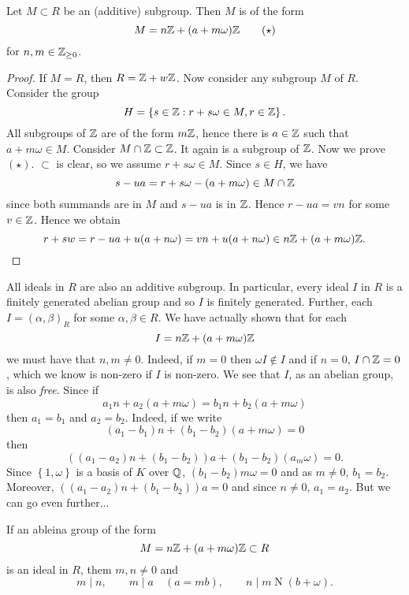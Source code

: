 
\begin{proposition}[]
	Let $M \subset R$ be an (additive) subgroup.
	Then $M$ is of the form
	\[
		M = n\mathbb{Z} + (a + m\omega)\mathbb{Z} \tag{$\star$}
	\]
	for $n, m \in \mathbb{Z}_{\geq 0}$.
\end{proposition}

\begin{proof}
	If $M = R$, then $R = \mathbb{Z} + w\mathbb{Z}$.
	Now consider any subgroup $M$ of $R$.
	Consider the group
	\[
		H = \left\{
			s \in \mathbb{Z}: r + s\omega \in M, r \in \mathbb{Z}
		\right\}.
	\]
	All subgroups of $\mathbb{Z}$ are of the form $m\mathbb{Z}$,
	hence there is $a \in \mathbb{Z}$ such that $a + m\omega \in M$.
	Consider $M \cap \mathbb{Z} \subset \mathbb{Z}$.
	It again is a subgroup of $\mathbb{Z}$.
	Now we prove $(\star)$.
	$\subset$ is clear, so we assume $r + s\omega \in M$.
	Since $s \in H$,
	we have
	\[
		s - ua = r + s\omega - (a + m\omega)
		\in M \cap \mathbb{Z}
	\]
	since both summands are in $M$ and $s - ua$ is in $\mathbb{Z}$.
	Hence $r - ua = vn$ for some $v \in \mathbb{Z}$.
	Hence we obtain
	\[
		r + sw
		= r - ua + u(a + n\omega)
		= vn + u(a + n\omega)
		\in n \mathbb{Z} + (a + m\omega)\mathbb{Z}.\qedhere
	\]
\end{proof}

All ideals in $R$ are also an additive subgroup.
In particular, every ideal $I$ in $R$ is a finitely generated
abelian group and so $I$ is finitely generated.
Further, each $I = (\alpha, \beta)_R$ for some
$\alpha, \beta \in R$.
We have actually shown that for each
\[
	I = n\mathbb{Z} + (a + m\omega)\mathbb{Z}
\]
we must have that $n,m \neq 0$.
Indeed, if $m = 0$ then $\omega I \not\in I$
and if $n = 0$, $I \cap \mathbb{Z} = 0$,
which we know is non-zero if $I$ is non-zero.
We see that $I$, as an abelian group, is also \emph{free}.
Since if
\[
	a_1 n + a_2 (a + m \omega) = b_1 n + b_2(a + m\omega)
\]
then $a_1 = b_1$ and $a_2 = b_2$.
Indeed, if we write 
\[
	(a_1 - b_1)n + (b_1 - b_2) (a + m \omega) = 0
\]
then
\[
	\left( (a_1 - a_2)n + (b_1 - b_2) \right)a
	+ (b_1 - b_2)(a _ m\omega) = 0.
\]
Since $\left\{
	1, \omega
\right\}$
is a basis of $K$ over $\mathbb{Q}$, $(b_1 - b_2) m \omega = 0$
and as $m \neq 0$, $b_1 = b_2$.
Moreover, $ \left( (a_1 - a_2)n + (b_1 - b_2)\right)a = 0$
and since $n \neq 0$, $a_1 = a_2$.
But we can go even further...

\begin{proposition}[]
	If an ableina group of the form
	\[
		M = n\mathbb{Z} + (a + m\omega)\mathbb{Z} \subset R
	\]
	is an ideal in $R$, them $m, n \neq 0$ and
	\[
		m \mid n, \qquad
		m \mid a \quad (a = mb), \qquad
		n \mid m\operatorname{N}(b + \omega).
	\]
\end{proposition}

